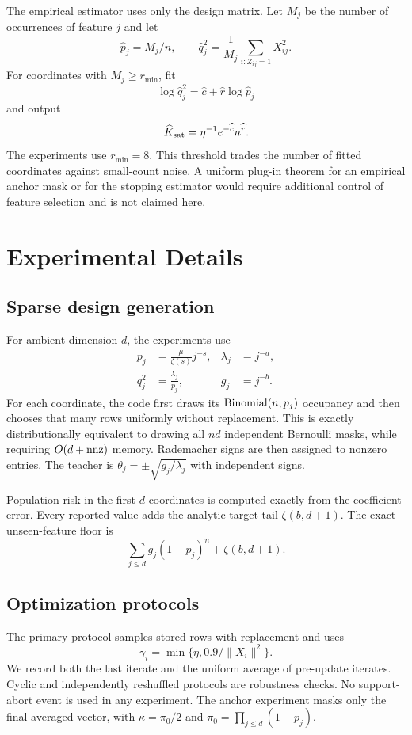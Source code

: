 \documentclass[letterpaper]{article}
\newcommand{\1}{\mathbf 1}
\begin{document}
The empirical estimator uses only the design matrix. Let $M_j$ be the number
of occurrences of feature $j$ and let
\[
\widehat p_j=M_j/n,
\qquad
\widehat q_j^2=\frac{1}{M_j}
\sum_{i:Z_{ij}=1}X_{ij}^2.
\]
For coordinates with $M_j\ge r_{\min}$, fit
\[
\log\widehat q_j^2=\widehat c+\widehat r\log\widehat p_j
\]
and output
\[
\widehat K_{\rm sat}
=\eta^{-1}e^{-\widehat c}n^{\widehat r}.
\]
The experiments use $r_{\min}=8$. This threshold trades the number of fitted
coordinates against small-count noise. A uniform plug-in theorem for an
empirical anchor mask or for the stopping estimator would require additional
control of feature selection and is not claimed here.

\section{Experimental Details}

\subsection{Sparse design generation}

For ambient dimension $d$, the experiments use
\begin{align*}
p_j&=\frac\mu{\zeta(s)}j^{-s},
&\lambda_j&=j^{-a},\\
q_j^2&=\frac{\lambda_j}{p_j},
&g_j&=j^{-b}.
\end{align*}
For each coordinate, the code first draws its
${\rm Binomial}(n,p_j)$ occupancy and then chooses that many rows uniformly
without replacement. This is exactly distributionally equivalent to drawing
all $nd$ independent Bernoulli masks, while requiring $O(d+{\rm nnz})$ memory.
Rademacher signs are then assigned to nonzero entries. The teacher is
$\theta_j=\pm\sqrt{g_j/\lambda_j}$ with independent signs.

Population risk in the first $d$ coordinates is computed exactly from the
coefficient error. Every reported value adds the analytic target tail
$\zeta(b,d+1)$. The exact unseen-feature floor is
\[
\sum_{j\le d}g_j(1-p_j)^n+\zeta(b,d+1).
\]

\subsection{Optimization protocols}

The primary protocol samples stored rows with replacement and uses
\[
\gamma_i=\min\{\eta,0.9/\|X_i\|^2\}.
\]
We record both the last iterate and the uniform average of pre-update iterates.
Cyclic and independently reshuffled protocols are robustness checks. No
support-abort event is used in any experiment. The anchor experiment masks only
the final averaged vector, with $\kappa=\pi_0/2$ and
$\pi_0=\prod_{j\le d}(1-p_j)$.
\end{document}
